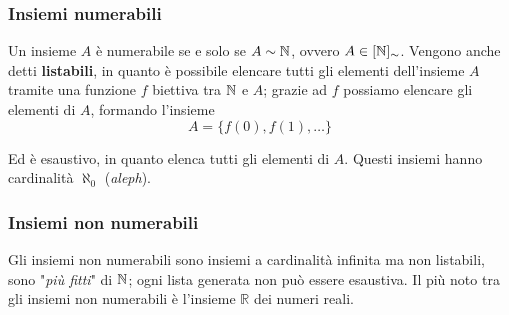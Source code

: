 \subsubsection{Insiemi numerabili}
Un insieme $A$ è numerabile se e solo se $A \sim \mathbb{N}$, ovvero $A \in [\mathbb{N}]_\sim$. Vengono anche detti \textbf{listabili}, in quanto è possibile elencare tutti gli elementi dell'insieme $A$ tramite una funzione $f$ biettiva tra $\mathbb{N}$ e $A$; grazie ad $f$ possiamo elencare gli elementi di $A$, formando l'insieme
$$ A = \{f(0), f(1), \dots \} $$

Ed è esaustivo, in quanto elenca tutti gli elementi di $A$. Questi insiemi hanno cardinalità $\aleph_0$ (\textit{aleph}).

\subsubsection{Insiemi non numerabili}

Gli insiemi non numerabili sono insiemi a cardinalità infinita ma non listabili, sono "\textit{più fitti}" di $\mathbb{N}$; ogni lista generata non può essere esaustiva. Il più noto tra gli insiemi non numerabili è l'insieme $\mathbb{R}$ dei numeri reali. \\

